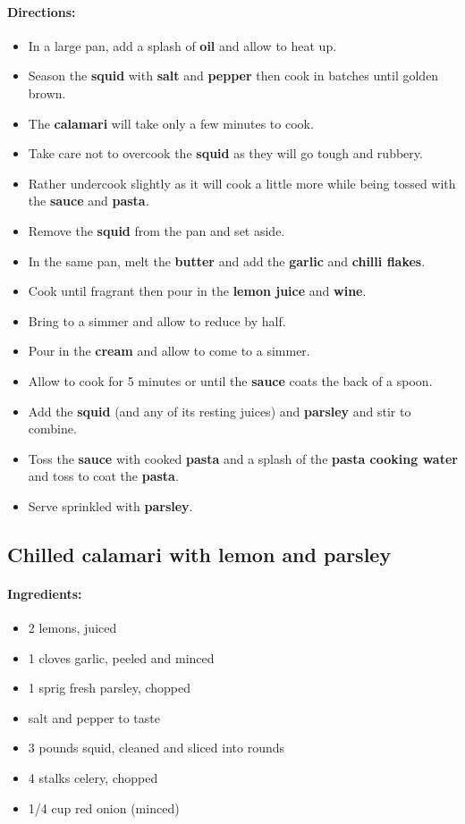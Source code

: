 \documentclass{article}
\begin{document}
\paragraph{Directions:}
\begin{itemize}
    \item In a large pan, add a splash of \textbf{oil} and allow to heat up.
    \item Season the \textbf{squid} with \textbf{salt} and \textbf{pepper} then cook in batches until golden brown.
    \item The \textbf{calamari} will take only a few minutes to cook.
    \item Take care not to overcook the \textbf{squid} as they will go tough and rubbery.
    \item Rather undercook slightly as it will cook a little more while being tossed with the \textbf{sauce} and \textbf{pasta}.
    \item Remove the \textbf{squid} from the pan and set aside.
    \item In the same pan, melt the \textbf{butter} and add the \textbf{garlic} and \textbf{chilli flakes}.
    \item Cook until fragrant then pour in the \textbf{lemon juice} and \textbf{wine}.
    \item Bring to a simmer and allow to reduce by half.
    \item Pour in the \textbf{cream} and allow to come to a simmer.
    \item Allow to cook for 5 minutes or until the \textbf{sauce} coats the back of a spoon.
    \item Add the \textbf{squid} (and any of its resting juices) and \textbf{parsley} and stir to combine.
    \item Toss the \textbf{sauce} with cooked \textbf{pasta} and a splash of the \textbf{pasta cooking water} and toss to coat the \textbf{pasta}.
    \item Serve sprinkled with \textbf{parsley}.
\end{itemize}

\subsection{Chilled calamari with lemon and parsley}

\paragraph{Ingredients:}
\begin{itemize}
    \item 2 lemons, juiced
    \item 1 cloves garlic, peeled and minced
    \item 1 sprig fresh parsley, chopped
    \item salt and pepper to taste
    \item 3 pounds squid, cleaned and sliced into rounds
    \item 4 stalks celery, chopped
    \item 1/4 cup red onion (minced)
\end{itemize}
\end{document}

